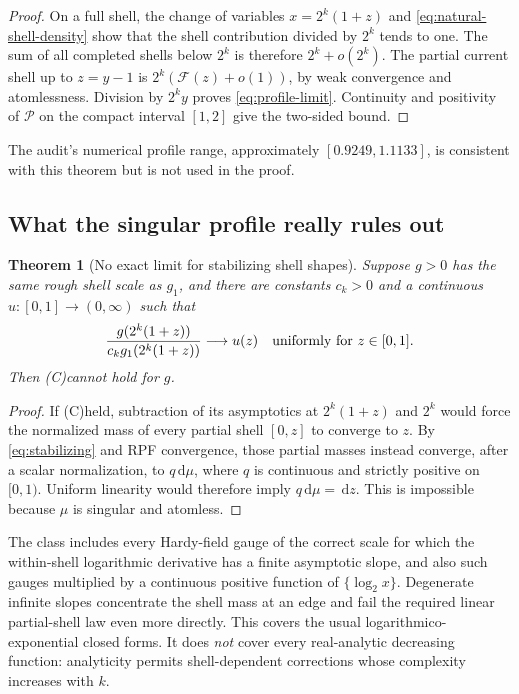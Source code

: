 \documentclass[11pt]{article}
\newtheorem{theorem}{Theorem}[section]
\theoremstyle{definition}
\theoremstyle{remark}
\newcommand{\dd}{\,\mathrm d}
\newcommand{\Ceq}{\textup{(C)}}
\begin{document}
\begin{proof}
On a full shell, the change of variables \(x=2^k(1+z)\) and
\eqref{eq:natural-shell-density} show that the shell contribution divided by
\(2^k\) tends to one.  The sum of all completed shells below \(2^k\) is
therefore \(2^k+o(2^k)\).  The partial current shell up to \(z=y-1\) is
\(2^k(\mathscr F(z)+o(1))\), by weak convergence and atomlessness.  Division
by \(2^ky\) proves \eqref{eq:profile-limit}.  Continuity and positivity of
\(\mathscr P\) on the compact interval \([1,2]\) give the two-sided bound.
\end{proof}
The audit's numerical profile range, approximately
\([0.9249,1.1133]\), is consistent with this theorem but is not used in the
proof.

\subsection{What the singular profile really rules out}

\begin{theorem}[No exact limit for stabilizing shell shapes]
\label{thm:no-stabilizing}
Suppose \(g>0\) has the same rough shell scale as \(g_1\), and there are
constants \(c_k>0\) and a continuous \(u:[0,1]\to(0,\infty)\) such that
\begin{equation}
 \frac{g(2^k(1+z))}{c_kg_1(2^k(1+z))}
 \longrightarrow u(z)
 \quad\hbox{uniformly for }z\in[0,1].
 \label{eq:stabilizing}
\end{equation}
Then \Ceq cannot hold for \(g\).
\end{theorem}

\begin{proof}
If \Ceq held, subtraction of its asymptotics at \(2^k(1+z)\) and
\(2^k\) would force the normalized mass of every partial shell \([0,z]\) to
converge to \(z\).  By \eqref{eq:stabilizing} and RPF convergence, those
partial masses instead converge, after a scalar normalization, to
\(q\dd\mu\), where \(q\) is continuous and strictly positive on \([0,1)\).
Uniform linearity would therefore imply \(q\dd\mu=\dd z\).  This is impossible
because \(\mu\) is singular and atomless.
\end{proof}

The class includes every Hardy-field gauge of the correct scale for which the
within-shell logarithmic derivative has a finite asymptotic slope, and also
such gauges multiplied by a continuous positive function of
\(\{\log_2x\}\).  Degenerate infinite slopes concentrate the shell mass at an
edge and fail the required linear partial-shell law even more directly.
This covers the usual logarithmico-exponential closed forms.  It does
\emph{not} cover every real-analytic decreasing function: analyticity permits
shell-dependent corrections whose complexity increases with \(k\).
\end{document}
